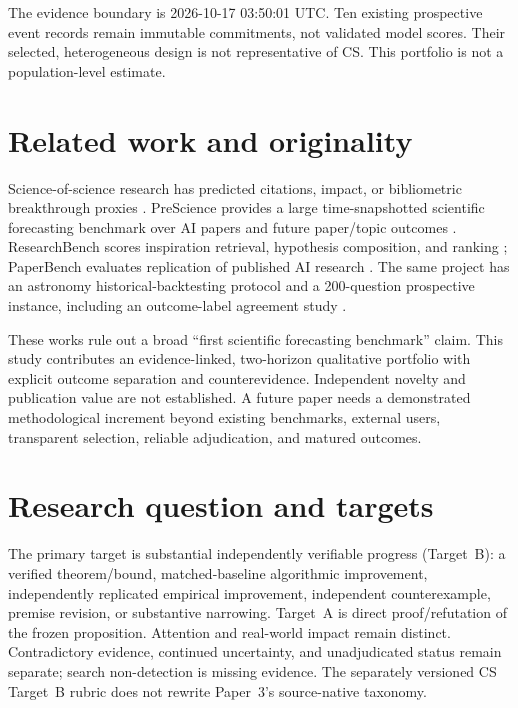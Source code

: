 \documentclass[11pt]{article}
\begin{document}
The evidence boundary is 2026-10-17 03:50:01 UTC. Ten existing prospective event records remain immutable commitments, not validated model scores. Their selected, heterogeneous design is not representative of CS. This portfolio is not a population-level estimate.

\section{Related work and originality}
Science-of-science research has predicted citations, impact, or bibliometric breakthrough proxies \citep{min2021breakthrough}. PreScience provides a large time-snapshotted scientific forecasting benchmark over AI papers and future paper/topic outcomes \citep{ajith2026prescience}. ResearchBench scores inspiration retrieval, hypothesis composition, and ranking \citep{liu2026researchbench}; PaperBench evaluates replication of published AI research \citep{starace2025paperbench}. The same project has an astronomy historical-backtesting protocol and a 200-question prospective instance, including an outcome-label agreement study \citep{mao2026questiondiscovery,mao2026backtesting}.

These works rule out a broad ``first scientific forecasting benchmark'' claim. This study contributes an evidence-linked, two-horizon qualitative portfolio with explicit outcome separation and counterevidence. Independent novelty and publication value are not established. A future paper needs a demonstrated methodological increment beyond existing benchmarks, external users, transparent selection, reliable adjudication, and matured outcomes.

\section{Research question and targets}
The primary target is substantial independently verifiable progress (Target~B): a verified theorem/bound, matched-baseline algorithmic improvement, independently replicated empirical improvement, independent counterexample, premise revision, or substantive narrowing. Target~A is direct proof/refutation of the frozen proposition. Attention and real-world impact remain distinct. Contradictory evidence, continued uncertainty, and unadjudicated status remain separate; search non-detection is missing evidence. The separately versioned CS Target~B rubric does not rewrite Paper~3's source-native taxonomy.
\end{document}
